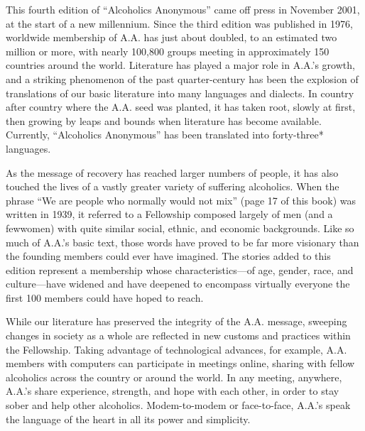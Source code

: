 

\begin{biblechapter}
    This fourth edition of “Alcoholics Anonymous” came off press in November 2001, at the start of a new millennium. 
\verse Since the third edition was published in 1976, worldwide membership of A.A. has just about doubled, 
    to an estimated two million or more, 
    with nearly 100,800 groups meeting in approximately 150 countries around the world. 
\verse Literature has played a major role in A.A.’s growth, 
    and a striking phenomenon of the past quarter-century has been the explosion of translations 
    of our basic literature into many languages and dialects. 
\verse In country after country where the A.A. seed was planted, it has taken root, 
    slowly at first, then growing by leaps and bounds when literature has become available. 
\verse Currently, “Alcoholics Anonymous” has been translated into forty-three* languages.

\verse As the message of recovery has reached larger numbers of people, 
    it has also touched the lives of a vastly greater variety of suffering alcoholics. 
\verse When the phrase “We are people who normally would not mix” (page 17 of this book) was written in 1939, 
    it referred to a Fellowship composed largely of men (and a fewwomen) 
    with quite similar social, ethnic, and economic backgrounds. 
\verse Like so much of A.A.’s basic text, 
    those words have proved to be far more visionary than the founding members could ever have imagined. 
\verse The stories added to this edition represent a membership whose characteristics—of age, gender, race, and culture—have widened and have deepened to encompass
    virtually everyone the first 100 members could have hoped to reach.

\verse While our literature has preserved the integrity of the A.A. message, 
    sweeping changes in society as a whole are reflected in new customs and practices within the Fellowship. 
\verse Taking advantage of technological advances, for example, 
    A.A. members with computers can participate in meetings online, 
    sharing with fellow alcoholics across the country or around the world. 
\verse In any meeting, anywhere, A.A.’s share experience, strength, and hope with each other, 
    in order to stay sober and help other alcoholics. 
\verse Modem-to-modem or face-to-face, A.A.’s speak the language of the heart in all its power and simplicity.
\end{biblechapter}


